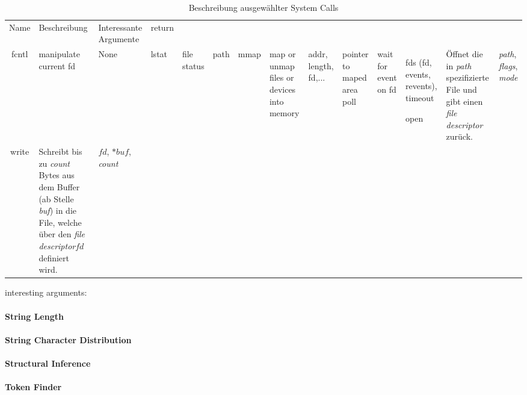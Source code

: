             
        \begin{table}[ht]
            \small
            \label{tab:syscall}
            \centering
            \begin{tabular}{c||p{6cm}|p{3cm}}
                \hline
                \\
                \hline
                Name & Beschreibung & Interessante Argumente & return\\
                \hline
                \hline
                fcntl & manipulate current fd & None & 
                \hline
                lstat & file status & path & 
                mmap & map or unmap files or devices into memory & addr, length, fd,... & pointer to maped area
                poll & wait for event on fd & fds (fd, events, revents), timeout


                open& Öffnet die in \textit{path} spezifizierte File und gibt einen \textit{file descriptor} zurück.& \textit{path}, \textit{flags}, \textit{mode} \\
                write& Schreibt bis zu \textit{count} Bytes aus dem Buffer (ab Stelle \textit{buf}) in die File, welche über den \textit{file descriptor}$fd$ definiert wird. & $fd$, $*buf$, \textit{count} \\
                \hline
            \end{tabular}
            \caption{Beschreibung ausgewählter System Calls}
        \end{table}

            interesting arguments:
                 
        \paragraph{String Length}
        \paragraph{String Character Distribution}
        \paragraph{Structural Inference}
        \paragraph{Token Finder}

